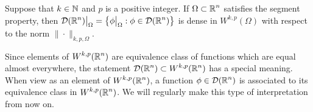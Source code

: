 \begin{theorem} \label{DDRRnDWkp}
Suppose that $k\in \mathbb{N}$ and $p$ is a positive integer.
If $\displaystyle \Omega \subset \mathbb{R}^n$ satisfies the segment property, then 
$\displaystyle \mathcal{D}(\mathbb{R}^n)\big|_{\Omega} =
\left\{ \phi\big|_{\Omega} : \phi \in \mathcal{D}(\mathbb{R}^n) \right\}$
is dense in $\displaystyle W^{k,p}(\Omega)$ with respect to the norm
$\|\cdot\|_{k,p,\Omega}$.
\end{theorem}

\begin{rmk}
Since elements of $\displaystyle W^{k,p}(\mathbb{R}^n)$ are equivalence class
of functions which are equal almost everywhere, the statement
$\displaystyle \mathcal{D}(\mathbb{R}^n) \subset W^{k,p}(\mathbb{R}^n)$ has a special meaning.
When view as an element of $\displaystyle W^{k,p}(\mathbb{R}^n)$, 
a function $\displaystyle \phi \in \mathcal{D}(\mathbb{R}^n)$ is associated to its
equivalence class in $\displaystyle W^{k,p}(\mathbb{R}^n)$.  We will regularly make
this type of interpretation from now on.
\end{rmk}


